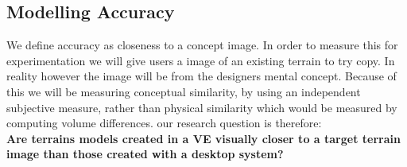 \documentclass{sig-alternate-05-2015}
\begin{document}
\subsection{Modelling Accuracy}
We define accuracy as closeness to a concept image. In order to measure this for experimentation we will give users a image of an existing terrain to try copy. In reality however the image will be from the designers mental concept. Because of this we will be measuring conceptual similarity, by using an independent subjective measure, rather than physical similarity which would be measured by computing volume differences. our research question is therefore:\\
\textbf{Are terrains models created in a VE visually closer to a target terrain image than those created with a desktop system?}\\
\end{document}

